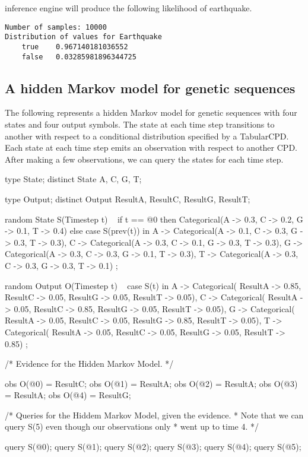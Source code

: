 \bl inference engine will produce the following likelihood of earthquake.
\begin{verbatim}
Number of samples: 10000
Distribution of values for Earthquake
	true	0.967140181036552
	false	0.03285981896344725
\end{verbatim}


\subsection{A hidden Markov model for genetic sequences}
\begin{example}
The following represents a hidden Markov model for genetic sequences with four states and four output symbols. The state at each time step transitions to another with respect to a conditional distribution specified by a TabularCPD. 
Each state at each time step emits an observation with respect to another CPD. After making a few observations, we can query the states for each time step.
\end{example}

\begin{blogcode}
type State;
distinct State A, C, G, T;

type Output;
distinct Output ResultA, ResultC, ResultG, ResultT;

random State S(Timestep t) ~
  if t == @0 then 
    Categorical({A -> 0.3, C -> 0.2, G -> 0.1, T -> 0.4})
  else case S(prev(t)) in {
    A -> Categorical({A -> 0.1, C -> 0.3, G -> 0.3, T -> 0.3}),
    C -> Categorical({A -> 0.3, C -> 0.1, G -> 0.3, T -> 0.3}),
    G -> Categorical({A -> 0.3, C -> 0.3, G -> 0.1, T -> 0.3}),
    T -> Categorical({A -> 0.3, C -> 0.3, G -> 0.3, T -> 0.1})
  };

random Output O(Timestep t) ~ 
  case S(t) in {
    A -> Categorical({
      ResultA -> 0.85, ResultC -> 0.05, 
      ResultG -> 0.05, ResultT -> 0.05}),
    C -> Categorical({
      ResultA -> 0.05, ResultC -> 0.85, 
      ResultG -> 0.05, ResultT -> 0.05}),
    G -> Categorical({
      ResultA -> 0.05, ResultC -> 0.05, 
      ResultG -> 0.85, ResultT -> 0.05}),
    T -> Categorical({
      ResultA -> 0.05, ResultC -> 0.05, 
      ResultG -> 0.05, ResultT -> 0.85})
  };

/* Evidence for the Hidden Markov Model.
 */

obs O(@0) = ResultC;
obs O(@1) = ResultA;
obs O(@2) = ResultA;
obs O(@3) = ResultA;
obs O(@4) = ResultG;

/* Queries for the Hiddem Markov Model, given the evidence.  
 * Note that we can query S(5) even though our observations only 
 * went up to time 4.
 */

query S(@0);
query S(@1);
query S(@2);
query S(@3);
query S(@4);
query S(@5);
\end{blogcode}

